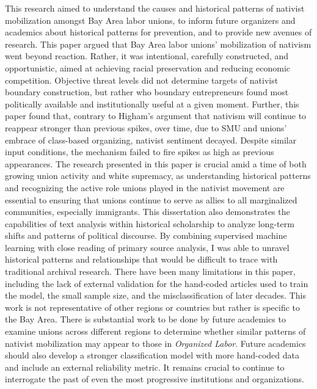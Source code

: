 \documentclass[12pt,a4paper]{article}
\begin{document}
This research aimed to understand the causes and historical patterns of nativist mobilization amongst Bay Area labor unions, to inform future organizers and academics about historical patterns for prevention, and to provide new avenues of research. This paper argued that Bay Area labor unions' mobilization of nativism went beyond reaction. Rather, it was intentional, carefully constructed, and opportunistic, aimed at achieving racial preservation and reducing economic competition. Objective threat levels did not determine targets of nativist boundary construction, but rather who boundary entrepreneurs found most politically available and institutionally useful at a given moment. Further, this paper found that, contrary to Higham’s argument that nativism will continue to reappear stronger than previous spikes, over time, due to SMU and unions’ embrace of class-based organizing, nativist sentiment decayed. Despite similar input conditions, the mechanism failed to fire spikes as high as previous appearances. The research presented in this paper is crucial amid a time of both growing union activity and white supremacy, as understanding historical patterns and recognizing the active role unions played in the nativist movement are essential to ensuring that unions continue to serve as allies to all marginalized communities, especially immigrants. This dissertation also demonstrates the capabilities of text analysis within historical scholarship to analyze long-term shifts and patterns of political discourse. By combining supervised machine learning with close reading of primary source analysis, I was able to unravel historical patterns and relationships that would be difficult to trace with traditional archival research. There have been many limitations in this paper, including the lack of external validation for the hand-coded articles used to train the model, the small sample size, and the misclassification of later decades. This work is not representative of other regions or countries but rather is specific to the Bay Area. There is substantial work to be done by future academics to examine unions across different regions to determine whether similar patterns of nativist mobilization may appear to those in \textit{Organized Labor}. Future academics should also develop a stronger classification model with more hand-coded data and include an external reliability metric. It remains crucial to continue to interrogate the past of even the most progressive institutions and organizations. 


\appendix
\end{document}

